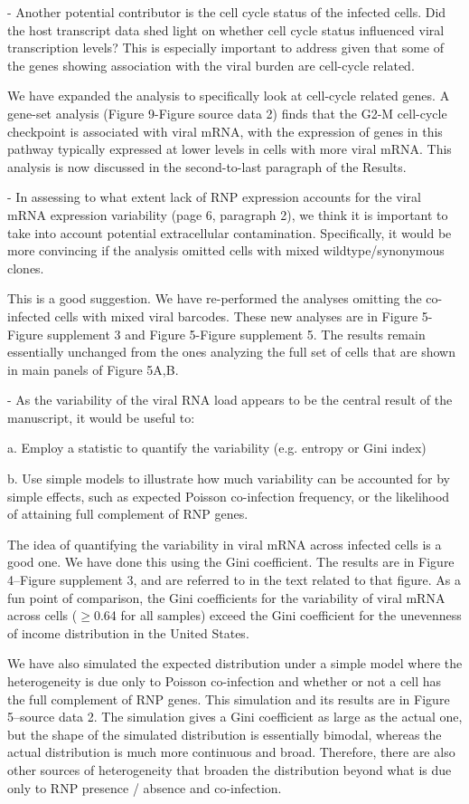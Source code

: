 \documentclass[11pt, oneside]{article}   	%
\begin{document}
- Another potential contributor is the cell cycle status of the infected cells. Did the host transcript data shed light on whether cell cycle status influenced viral transcription levels? This is especially important to address given that some of the genes showing association with the viral burden are cell-cycle related. 

{\color{black}
We have expanded the analysis to specifically look at cell-cycle related genes.
A gene-set analysis (Figure 9-Figure source data 2) finds that the G2-M cell-cycle checkpoint is associated with viral mRNA, with the expression of genes in this pathway typically expressed at lower levels in cells with more viral mRNA.
This analysis is now discussed in the second-to-last paragraph of the Results.
}

- In assessing to what extent lack of RNP expression accounts for the viral mRNA expression variability (page 6, paragraph 2), we think it is important to take into account potential extracellular contamination. Specifically, it would be more convincing if the analysis omitted cells with mixed wildtype/synonymous clones. 

{\color{black}
This is a good suggestion.
We have re-performed the analyses omitting the co-infected cells with mixed viral barcodes.
These new analyses are in Figure 5-Figure supplement 3 and Figure 5-Figure supplement 5.
The results remain essentially unchanged from the ones analyzing the full set of cells that are shown in main panels of Figure 5A,B.
}

- As the variability of the viral RNA load appears to be the central result of the manuscript, it would be useful to: 

    a. Employ a statistic to quantify the variability (e.g. entropy or Gini index) 

    b. Use simple models to illustrate how much variability can be accounted for by simple effects, such as expected Poisson co-infection frequency, or the likelihood of attaining full complement of RNP genes. 

{\color{black}
The idea of quantifying the variability in viral mRNA across infected cells is a good one.
We have done this using the Gini coefficient.
The results are in Figure 4--Figure supplement 3, and are referred to in the text related to that figure.
As a fun point of comparison, the Gini coefficients for the variability of viral mRNA across cells ($\ge$0.64 for all samples) exceed the Gini coefficient for the unevenness of income distribution in the United States.

We have also simulated the expected distribution under a simple model where the heterogeneity is due only to Poisson co-infection and whether or not a cell has the full complement of RNP genes.
This simulation and its results are in Figure 5--source data 2. 
The simulation gives a Gini coefficient as large as the actual one, but the shape of the simulated distribution is essentially bimodal, whereas the actual distribution is much more continuous and broad.
Therefore, there are also other sources of heterogeneity that broaden the distribution beyond what is due only to RNP presence / absence and co-infection. 
}
\end{document}
